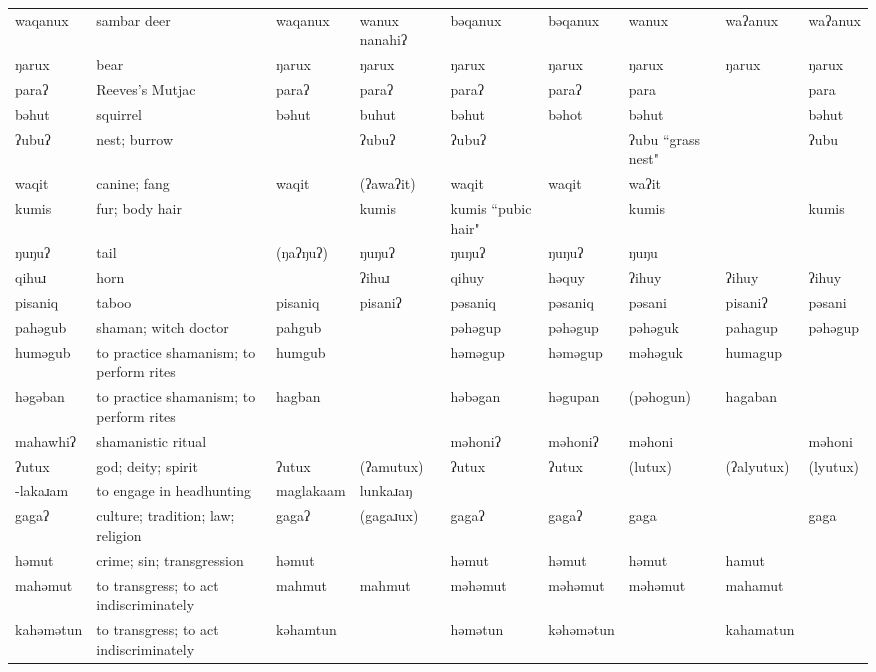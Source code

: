 \begin{landscape}
\begin{longtable}{*{9}{p{}}}
\text{*}waqanux & sambar deer & waqanux & wanux nanahiʔ & bəqanux & bəqanux & wanux & waʔanux & waʔanux\\
\text{*}ŋarux & bear & ŋarux & ŋarux & ŋarux & ŋarux & ŋarux & ŋarux & ŋarux\\
\text{*}paraʔ & Reeves's Mutjac & paraʔ & paraʔ & paraʔ & paraʔ & para &  & para\\
\text{*}bəhut & squirrel & bəhut & buhut & bəhut & bəhot & bəhut &  & bəhut\\
\text{*}ʔubuʔ & nest; burrow &  & ʔubuʔ & ʔubuʔ &  & ʔubu ``grass nest" &  & ʔubu\\
\text{*}waqit & canine; fang & waqit & (ʔawaʔit) & waqit & waqit & waʔit &  & \\
\text{*}kumis & fur; body hair &  & kumis & kumis ``pubic hair" &  & kumis &  & kumis\\
\text{*}ŋuŋuʔ & tail & (ŋaʔŋuʔ) & ŋuŋuʔ & ŋuŋuʔ & ŋuŋuʔ & ŋuŋu &  & \\
\text{*}qihuɹ & horn &  & ʔihuɹ & qihuy & həquy & ʔihuy & ʔihuy & ʔihuy\\
\text{*}pisaniq & taboo & pisaniq & pisaniʔ & pəsaniq & pəsaniq & pəsani & pisaniʔ & pəsani\\
\text{*}pahəgub & shaman; witch doctor & pahgub &  & pəhəgup & pəhəgup & pəhəguk & pahagup & pəhəgup\\
\text{*}huməgub & to practice shamanism; to perform rites & humgub &  & həməgup & həməgup & məhəguk & humagup & \\
\text{*}həgəban & to practice shamanism; to perform rites & hagban &  & həbəgan & həgupan & (pəhogun) & hagaban & \\
\text{*}mahawhiʔ & shamanistic ritual &  &  & məhoniʔ & məhoniʔ & məhoni &  & məhoni\\
\text{*}ʔutux & god; deity; spirit & ʔutux & (ʔamutux) & ʔutux & ʔutux & (lutux) & (ʔalyutux) & (lyutux)\\
\text{*}-lakaɹam & to engage in headhunting & maglakaam & lunkaɹaŋ &  &  &  &  & \\
\text{*}gagaʔ & culture; tradition; law; religion & gagaʔ & (gagaɹux) & gagaʔ & gagaʔ & gaga &  & gaga\\
\text{*}həmut & crime; sin; transgression & həmut &  & həmut & həmut & həmut & hamut & \\
\text{*}mahəmut & to transgress; to act indiscriminately & mahmut & mahmut & məhəmut & məhəmut & məhəmut & mahamut & \\
\text{*}kahəmətun & to transgress; to act indiscriminately & kəhamtun &  & həmətun & kəhəmətun &  & kahamatun & \\

\end{longtable}
\end{landscape}
